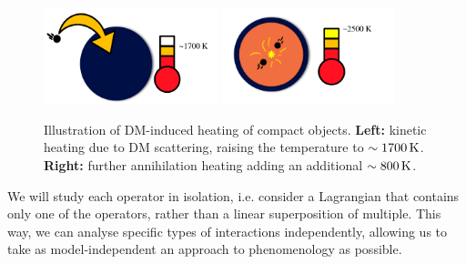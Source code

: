 \begin{figure}
    \centering
    \includegraphics[width=0.45\textwidth]{img/chapter_1/kin_heat_NS.pdf}
    \includegraphics[width=0.45\textwidth]{img/chapter_1/ann_heat_NS.pdf}
    \caption{Illustration of DM-induced heating of compact objects. \textbf{Left:} kinetic heating due to DM scattering, raising the temperature to $\sim 1700 {\rm \,K}$. \textbf{Right:} further annihilation heating adding an additional $\sim 800{\rm \,K}$.}
    \label{fig:cartoon_NS_heat}
\end{figure}





We will study each operator in isolation, i.e. consider a Lagrangian that contains only one of the operators, rather than a linear superposition of multiple. This way, we can analyse specific types of interactions independently, allowing us to take as model-independent an approach to phenomenology as possible. 